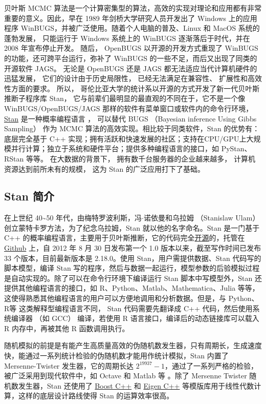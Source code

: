 \documentclass[12pt,a4paper,UTF8,twoside]{book}
\theoremstyle{definition}
\theoremstyle{definition}
\theoremstyle{definition}
\theoremstyle{remark}
\begin{document}
贝叶斯 MCMC
算法是一个计算密集型的算法，高效的实现对理论和应用都有非常重要的意义。因此，早在
1989 年剑桥大学研究人员开发出了 Windows 上的应用程序
WinBUGS，并被广泛使用。随着个人电脑的普及、Linux 和 MacOS
系统的蓬勃发展， 只能运行于 Windows 系统上的 WinBUGS
逐渐落后于时代，并在 2008 年宣布停止开发。 随后， OpenBUGS
以开源的开发方式重现了 WinBUGS 的功能，还可跨平台运行，弥补了 WinBUGS
的一些不足，而后又出现了同类的开源软件 JAGS。 无论是 OpenBUGS 还是 JAGS
都无法适应当代计算机硬件的迅猛发展， 它们的设计由于历史局限性，
已经无法满足在兼容性、 扩展性和高效性方面的要求。 所以，
哥伦比亚大学的统计系以开源的方式开发了新一代贝叶斯推断子程序库 Stan，
它与前辈们最明显的最直观的不同在于，它不是一个像 WinBUGS/OpenBUGS/JAGS
那样的软件有菜单窗口或软件内的命令行环境，
\href{http://mc-stan.org/}{Stan} 是一种概率编程语言
\citep{Stan2017JSS}， 可以替代 BUGS （Bayesian inference Using Gibbs
Sampling） \citep{BUGS2009} 作为 MCMC
算法的高效实现。相比较于同类软件，Stan 的优势有：底层完全基于 C++
实现；拥有活跃和快速发展的社区；支持在CPU/GPU上大规模并行计算；独立于系统和硬件平台；提供多种编程语言的接口，如
PyStan、 RStan 等等。 在大数据的背景下，
拥有数千台服务器的企业越来越多， 计算机资源达到前所未有的规模， 这为
Stan 的广泛应用打下了基础。

\hypertarget{subsec:stan-samplers}{%
\subsection{Stan 简介}\label{subsec:stan-samplers}}

在上世纪 40\textasciitilde{}50
年代，由梅特罗波利斯，冯\(\cdot\)诺依曼和乌拉姆 （Stanislaw Ulam）
创立蒙特卡罗方法，为了纪念乌拉姆，Stan 就以他的名字命名。Stan 是一门基于
C++
的概率编程语言，主要用于贝叶斯推断，它的代码完全\href{http://mc-stan.org/}{开源}的，托管在
\href{https://github.com/stan-dev/stan}{Github} 上，自 2012 年 8 月 30
日发布第一个 1.0 版本以来，截至写作时间已发布 33 个版本，目前最新版本是
2.18.0。使用 Stan，用户需提供数据、Stan 代码写的脚本模型，编译 Stan
写的程序，然后与数据一起运行，模型参数的后验模拟过程是自动实现的。除了可以在命令行环境下编译运行
Stan 脚本中写模型外，Stan 还提供其他编程语言的接口，如
R、Python、Matlab、Mathematica、Julia
等等，这使得熟悉其他编程语言的用户可以方便地调用和分析数据。但是，与
Python、R等 这类解释型编程语言不同， Stan 代码需要先翻译成 C++
代码，然后使用系统编译器 （如 GCC） 编译，若使用 R
语言接口，编译后的动态链接库可以载入 R 内存中，再被其他 R 函数调用执行。

随机模拟的前提是有能产生高质量高效的伪随机数发生器，只有周期长，生成速度快，能通过一系列统计检验的伪随机数才能用作统计模拟，Stan
内置了 Mersenne-Twister 发生器，它的周期长达
\(2^{19937}-1\)，通过了一系列严格的检验，被广泛采用到现代软件中，如
Octave 和 Matlab 等 \citep{Huang2017COS}。除了 Mersenne Twister
随机数发生器，Stan 还使用了 \href{https://www.boost.org/}{Boost C++} 和
\href{http://eigen.tuxfamily.org/index.php?title=Main_Page}{Eigen C++}
等模版库用于线性代数计算，这样的底层设计路线使得 Stan 的运算效率很高。
\end{document}
